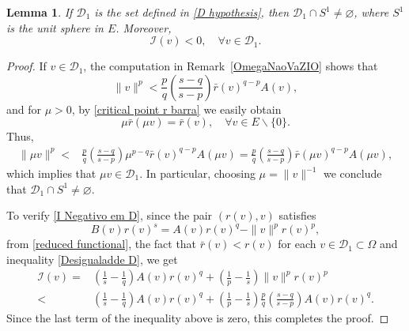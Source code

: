 \documentclass[12pt,reqno]{amsart}
\newtheorem{lemma}[theorem]{Lemma}
\begin{document}
\begin{lemma}\label{Lira}If $\mathcal{D}_1$ is the set defined in \eqref{D hypothesis}, then  $\mathcal{D}_1\cap S^1\neq \varnothing$, where $S^1$ is the unit sphere in $E$. Moreover,
\begin{equation}\label{I Negativo em D}
\mathcal{I}(v)<0, \quad \forall v\in\mathcal{D}_1. 
\end{equation}
\end{lemma}
\begin{proof}
     If $v \in \mathcal{D}_1$, the computation in Remark~\ref{OmegaNaoVaZIO} shows that 
 \begin{equation}\label{Desigualadde D}
 \|v\|^p<\frac{p}{q}\left(\frac{s-q}{s-p}\right)\bar{r}(v)^{q-p}A(v),
 \end{equation}
 and for $\mu>0$, by \eqref{critical point r barra} we easily obtain 
$$
\mu \bar{r}(\mu v)=\bar{r}(v),\quad \forall v \in E\backslash\{0\}.
 $$
 Thus, 
 	\begin{align*}
		\|\mu v\|^p<&\frac{p}{q}\left(\frac{s-q}{s-p}\right)\mu^{p-q}\bar{r}(v)^{q-p}A(\mu v)
		=\frac{p}{q}\left(\frac{s-q}{s-p}\right)\bar{r}(\mu v)^{q-p}A(\mu v),
	\end{align*} 
which implies that $\mu v \in \mathcal{D}_1$. In particular, choosing $\mu=\|v\|^{-1}$ we conclude that $\mathcal{D}_1\cap S^1\neq \varnothing$.	

To verify \eqref{I Negativo em D}, since the pair $(r(v),v)$ satisfies 
\begin{equation*}
		B(v)r(v)^s=A(v)r(v)^q-\|v\|^pr(v)^p, 
	\end{equation*}	
 from  \eqref{reduced functional}, the fact that $\bar{r}(v)<r(v)$ for each $v \in \mathcal{D}_1\subset\Omega$ and inequality \eqref{Desigualadde D}, we get
	\begin{align*}
		\mathcal{I}(v)
		=& \left(\frac{1}{s}-\frac{1}{q}\right)A(v)r(v)^q+\left(\frac{1}{p}-\frac{1}{s}\right) \|v\|^p r(v)^p\\
		<& \left(\frac{1}{s}-\frac{1}{q}\right)A(v)r(v)^q+\left(\frac{1}{p}-\frac{1}{s}\right)\frac{p}{q}\left(\frac{s-q}{s-p}\right)A(v)r(v)^q.
	\end{align*}
Since the last term of the inequality above is zero, this completes the proof. \end{proof}
	
\end{document}
